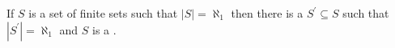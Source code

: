 \documentclass[12pt]{article}
\begin{document}
If $S$ is a set of finite sets such that $|S|=\aleph_1$ then there is a $S^\prime\subseteq S$ such that $|S^\prime|=\aleph_1$ and $S$ is a .
\end{document}

